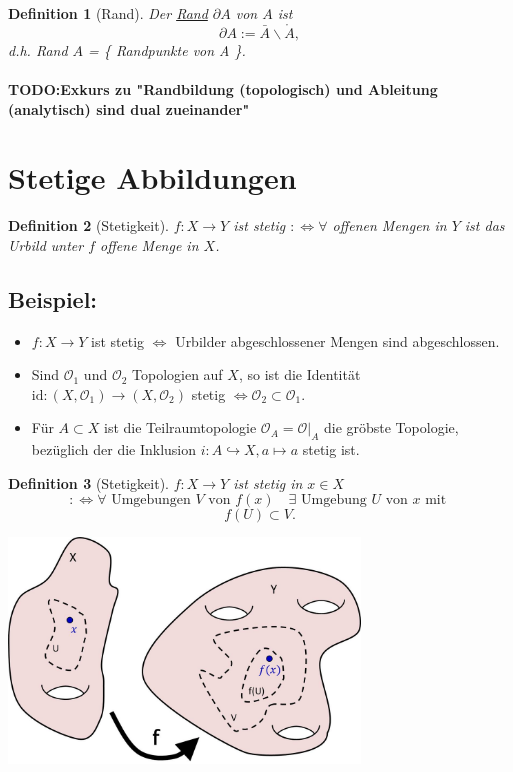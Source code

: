 \documentclass[a4paper,11pt,notitlepage]{report}
\newtheorem{definition}{Definition}[chapter]
\newcommand{\OO}{{\ensuremath{\mathcal{O}}}}
\newenvironment{bsp}[1]
{
\setlength{\fboxsep}{10pt}
\subsection*{Beispiel: #1}
\begin{upshape}
}
{
\end{upshape}
}
\begin{document}
\begin{definition}[Rand]
	Der \underline{Rand} $\partial A$ von $A$ ist $$\partial A := \bar{A} \backslash \mathring A,$$ d.h. Rand $A$ = \{ Randpunkte von A \}.
\end{definition}

\paragraph{TODO:Exkurs zu "Randbildung (topologisch) und Ableitung (analytisch) sind dual zueinander"}

\section{Stetige Abbildungen}

\begin{definition}[Stetigkeit]
	$f \colon X \rightarrow Y$ ist stetig $:\Leftrightarrow \forall$ offenen Mengen in $Y$ ist das Urbild unter $f$ offene Menge in $X$.
\end{definition}

\begin{bsp}{}
	\begin{itemize}
		\item $f \colon X \rightarrow Y$ ist stetig $\Leftrightarrow$ Urbilder abgeschlossener Mengen sind abgeschlossen.
		\item Sind $\OO_1$ und $\OO_2$ Topologien auf $X$, so ist die Identität $\text{id} \colon (X,\OO_1) \rightarrow (X,\OO_2)$ stetig $\Leftrightarrow \OO_2 \subset \OO_1$.
		\item Für $A \subset X$ ist die Teilraumtopologie $\OO_A = \OO \big |_A$ die gröbste Topologie, bezüglich der die Inklusion $i \colon A \hookrightarrow X, a \mapsto a$ stetig ist.
	\end{itemize}
\end{bsp}

\begin{definition}[Stetigkeit] %
	$f \colon X \rightarrow Y$ ist stetig in $x \in X$
	$$:\Leftrightarrow \forall \text{ Umgebungen } V \text{ von } f(x) \quad \exists \text{ Umgebung } U \text{ von } x \text{ mit }$$ $$f(U) \subset V.$$
	\newline
\end{definition}
\begin{center}
\includegraphics[width=0.7\textwidth]{images/stetig_in_x.jpg}
\end{center}
\end{document}
